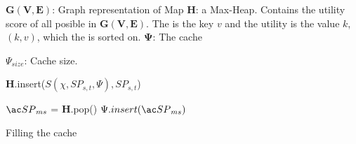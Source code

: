 \begin{algorithm}%
\dontprintsemicolon
\SetVline


\KwData
{

	$\mathbf{G(V,E)}$: Graph representation of Map \;
	\textbf{H}: a Max-Heap. Contains the utility score of all posible \spaths in $\mathbf{G(V,E)}$. The \spath is the key $v$ and the utility is the value $k$, $(k, v)$, which the is sorted on.\;
	$\mathbf{\Psi}$: The cache \;
}

\Input
{

$\Psi_{size}$: Cache size.

}

{
	\textbf{H}.insert($S(\chi, SP_{s,t}, \Psi), SP_{s,t}$) \;
}

{
	$\spath_{ms}$ = \textbf{H}.pop() \; 
	{
		$\Psi.insert(\spath_{ms})$\;
	}
}

\caption{Filling the cache}
\label{alg:greedy}
\end{algorithm}